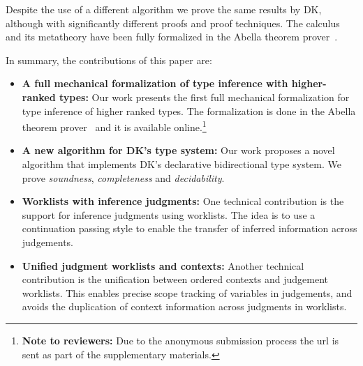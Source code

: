 Despite the use of a different algorithm we prove the
same results by DK, although with significantly different proofs and
proof techniques. The calculus and its metatheory
have been fully formalized in the Abella theorem prover~\cite{AbellaDesc}. %

In summary, the contributions of this paper are:

\begin{itemize}

\item {\bf A full mechanical formalization of type inference with
  higher-ranked types:} Our work presents the first full mechanical formalization
  for type inference of higher ranked types. The formalization is done in the
  Abella theorem prover~\cite{AbellaDesc} and it is available
  online.\footnote{{\bf Note to reviewers:} Due to the anonymous submission process
  the url is sent as part of the supplementary materials.}

\item {\bf A new algorithm for DK's type system:} Our work proposes a novel algorithm that implements
  DK's declarative bidirectional type system. We prove
  \emph{soundness}, \emph{completeness} and
  \emph{decidability}. 

\item {\bf Worklists with inference judgments:} One technical contribution is the
  support for inference judgments using worklists. The idea is to
  use a continuation passing style to enable the transfer of inferred information across
  judgements. 

\item {\bf Unified judgment worklists and contexts:} Another technical contribution is the unification
  between ordered contexts and judgement worklists. This enables precise scope tracking
  of variables in judgements, and avoids the duplication of context information across
  judgments in worklists.


\end{itemize}
